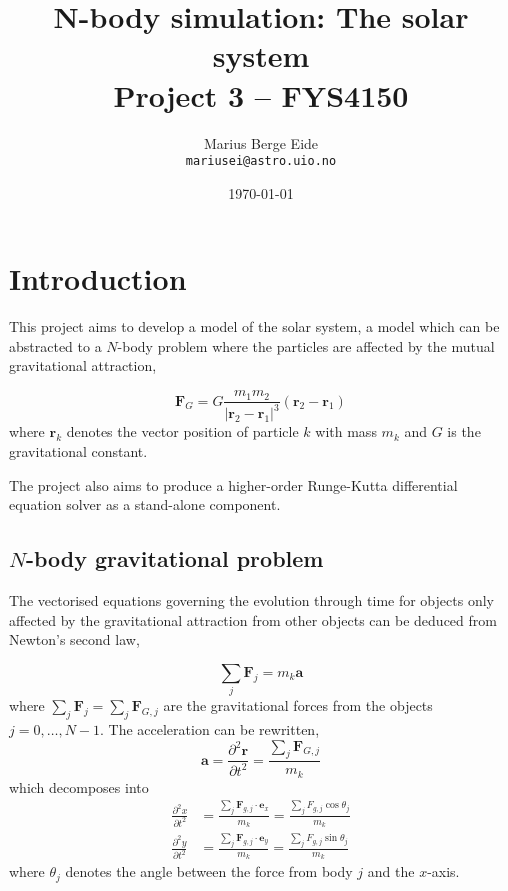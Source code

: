 \documentclass[a4paper,11pt]{article}
\date{\today}
\title{N-body simulation: The solar system\\ \small{Project 3 -- FYS4150}}
\author{Marius Berge Eide \\
\texttt{mariusei@astro.uio.no}}
\begin{document}
\onecolumn
\maketitle{}

\begin{abstract}
\end{abstract}

\section{Introduction}
This project aims to develop a model of the solar system, a model which can be abstracted to a $N$-body problem where the particles are affected by the mutual gravitational attraction,

\begin{equation}
    \mathbf{F}_G = G \frac{m_1 m_2}{|\mathbf{r}_2 - \mathbf{r}_1|^3} \left( \mathbf{r}_2 - \mathbf{r}_1  \right)
    \label{eq:gravity}
\end{equation}
where $\mathbf{r}_k$ denotes the vector position of particle $k$ with mass $m_k$ and $G$ is the gravitational constant. 

The project also aims to produce a higher-order Runge-Kutta differential equation solver as a stand-alone component. 

\subsection{$N$-body gravitational problem}
The vectorised equations governing the evolution through time for objects only affected by the gravitational attraction from other objects can be deduced from Newton's second law,

\begin{equation}
    \sum_j \mathbf{F}_j = m_k \mathbf{a}
    \label{eq:N2L}
\end{equation}
where $\sum_j \mathbf{F}_j = \sum_j \mathbf{F}_{G,j}$ are the gravitational forces from the objects $j=0,\dots,N-1$. The acceleration can be rewritten,
\[ \mathbf{a} = \frac{\partial^2 \mathbf{r}}{\partial t^2} = \frac{\sum_j \mathbf{F}_{G,j}}{m_k} \]
which decomposes into
\begin{align}
    \frac{\partial^2 x}{\partial t^2} &= \frac{\sum_j \mathbf{F}_{g,j} \cdot \mathbf{e}_x}{m_k} = \frac{\sum_j F_{g,j} \cos \theta_j}{m_k} 
    \label{eq:diffx} \\
    \frac{\partial^2 y}{\partial t^2} &= \frac{\sum_j \mathbf{F}_{g,j} \cdot \mathbf{e}_y}{m_k} = \frac{\sum_j F_{g,j} \sin \theta_j }{m_k}
    \label{eq:diffy}
\end{align}
where $\theta_j$ denotes the angle between the force from body $j$ and the $x$-axis.
\end{document}
